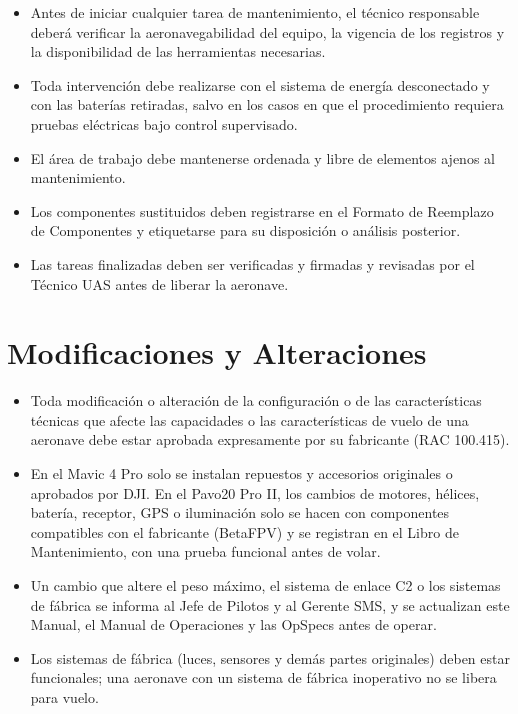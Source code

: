 \begin{itemize}
    \item Antes de iniciar cualquier tarea de mantenimiento, el técnico responsable deberá verificar la aeronavegabilidad del equipo, la vigencia de los registros y la disponibilidad de las herramientas necesarias.

    \item Toda intervención debe realizarse con el sistema de energía desconectado y con las baterías retiradas, salvo en los casos en que el procedimiento requiera pruebas eléctricas bajo control supervisado.

    \item El área de trabajo debe mantenerse ordenada y libre de elementos ajenos al mantenimiento.

    \item Los componentes sustituidos deben registrarse en el Formato de Reemplazo de Componentes y etiquetarse para su disposición o análisis posterior.

    \item Las tareas finalizadas deben ser verificadas y firmadas y revisadas por el Técnico UAS antes de liberar la aeronave.
\end{itemize}

\section{Modificaciones y Alteraciones}
\begin{itemize}
    \item Toda modificación o alteración de la configuración o de las características técnicas que afecte las capacidades o las características de vuelo de una aeronave debe estar aprobada expresamente por su fabricante (RAC 100.415).
    \item En el Mavic 4 Pro solo se instalan repuestos y accesorios originales o aprobados por DJI. En el Pavo20 Pro II, los cambios de motores, hélices, batería, receptor, GPS o iluminación solo se hacen con componentes compatibles con el fabricante (BetaFPV) y se registran en el Libro de Mantenimiento, con una prueba funcional antes de volar.
    \item Un cambio que altere el peso máximo, el sistema de enlace C2 o los sistemas de fábrica se informa al Jefe de Pilotos y al Gerente SMS, y se actualizan este Manual, el Manual de Operaciones y las OpSpecs antes de operar.
    \item Los sistemas de fábrica (luces, sensores y demás partes originales) deben estar funcionales; una aeronave con un sistema de fábrica inoperativo no se libera para vuelo.
\end{itemize}

